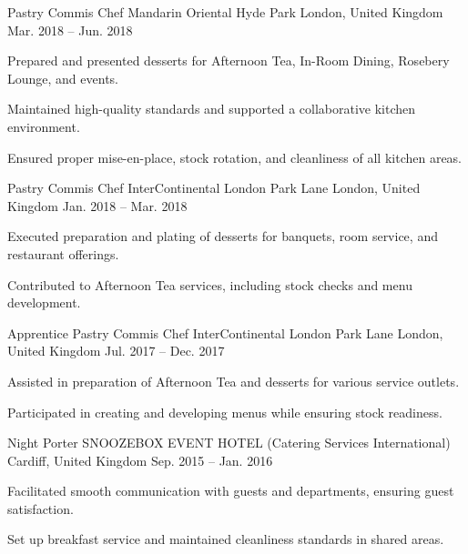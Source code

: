 \begin{cventries}
  \cventry
    {Pastry Commis Chef} %
    {Mandarin Oriental Hyde Park} %
    {London, United Kingdom} %
    {Mar. 2018 -- Jun. 2018} %
    {
      \begin{cvitems} %
        \item {Prepared and presented desserts for Afternoon Tea, In-Room Dining, Rosebery Lounge, and events.}
        \item {Maintained high-quality standards and supported a collaborative kitchen environment.}
        \columnbreak
        \item {Ensured proper mise-en-place, stock rotation, and cleanliness of all kitchen areas.}
      \end{cvitems}
    }

  \cventry
    {Pastry Commis Chef} %
    {InterContinental London Park Lane} %
    {London, United Kingdom} %
    {Jan. 2018 -- Mar. 2018} %
    {
      \begin{cvitems} %
        \item {Executed preparation and plating of desserts for banquets, room service, and restaurant offerings.}
        \item {Contributed to Afternoon Tea services, including stock checks and menu development.}
      \end{cvitems}
    }

  \cventry
    {Apprentice Pastry Commis Chef} %
    {InterContinental London Park Lane} %
    {London, United Kingdom} %
    {Jul. 2017 -- Dec. 2017} %
    {
      \begin{cvitems} %
        \item {Assisted in preparation of Afternoon Tea and desserts for various service outlets.}
        \item {Participated in creating and developing menus while ensuring stock readiness.}
      \end{cvitems}
    }

  \cventry
    {Night Porter} %
    {SNOOZEBOX EVENT HOTEL (Catering Services International)} %
    {Cardiff, United Kingdom} %
    {Sep. 2015 -- Jan. 2016} %
    {
      \begin{cvitems} %
        \item {Facilitated smooth communication with guests and departments, ensuring guest satisfaction.}
        \item {Set up breakfast service and maintained cleanliness standards in shared areas.}
      \end{cvitems}
    }


\end{cventries}
